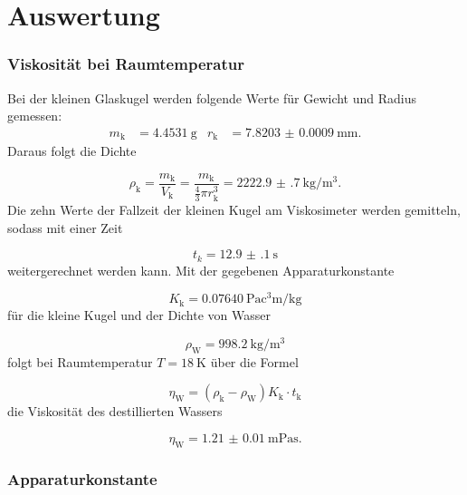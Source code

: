 \section{Auswertung}
\label{sec:Auswertung}

\subsubsection{Viskosität bei Raumtemperatur}

Bei der kleinen Glaskugel werden folgende Werte für Gewicht und Radius
gemessen:
\begin{align}
  m_\text{k} & = \SI{4.4531}{\gram} & r_\text{k} & =
  \SI{7.8203(9)}{\milli\meter}.
\end{align}
Daraus folgt die Dichte

\begin{equation}
  \rho_\text{k} = \frac{m_\text{k}}{V_\text{k}} = \frac{m_\text{k}}
  {\frac{4}{3}\pi r_\text{k}^3} = \SI{2222.9(7)}{\kilo\gram\per\cubic\meter}.
\end{equation}
Die zehn Werte der Fallzeit der kleinen Kugel am Viskosimeter werden gemitteln,
sodass mit einer Zeit

\begin{equation}
  t_{k} = \SI{12.9(1)}{\second}
\end{equation}
weitergerechnet werden kann.
Mit der gegebenen Apparaturkonstante

\begin{equation}
  K_\text{k} = \SI{0.07640}{\pascal\cubic\centi\meter\per\kilo\gram}
\end{equation}
für die kleine Kugel und der Dichte von Wasser \cite{Wasserdichte}

\begin{equation}
  \rho_\text{W} = \SI{998.2}{\kilo\gram\per\cubic\meter}
\end{equation}
folgt bei Raumtemperatur $T=\SI{18}{\kelvin}$ über die Formel

\begin{equation}
  \eta_\text{W} = (\rho_\text{k}-\rho_\text{W})K_\text{k} \cdot t_\text{k}
  \label{eqn:Viskositaet}
\end{equation}
die Viskosität des destillierten Wassers

\begin{equation}
  \eta_\text{W} = \SI{1.21(1)}{\milli\pascal\second}.
  \label{eqn:Viskosi}
\end{equation}

\subsubsection{Apparaturkonstante}

